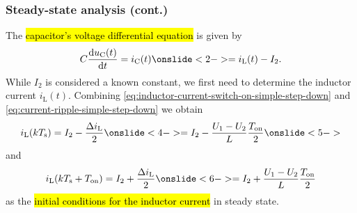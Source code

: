 \begin{frame}
    \frametitle{Steady-state analysis (cont.)}
     The \hl{capacitor's voltage differential equation} is given by
    \begin{equation}
        C \frac{\mathrm{d}u_\mathrm{C}(t)}{\mathrm{d}t} = i_\mathrm{C}(t) \onslide<2-> = i_\mathrm{L}(t) - I_2.
        \label{eq:capacitor-voltage-differential-equation-step-down-converter}
    \end{equation}
    While $I_2$ is considered a known constant, we first need to determine the inductor current $i_\mathrm{L}(t)$. Combining \eqref{eq:inductor-current-switch-on-simple-step-down} and \eqref{eq:current-ripple-simple-step-down} we obtain
    \begin{equation}
         i_\mathrm{L}(k T_\mathrm{s})  = I_2 - \frac{\Delta i_\mathrm{L}}{2} \onslide<4-> = I_2 - \frac{U_1 - U_2}{L} \frac{T_\mathrm{on}}{2} \onslide<5->
    \end{equation}
    and
    \begin{equation}
        i_\mathrm{L}(k T_\mathrm{s} + T_\mathrm{on})  = I_2 + \frac{\Delta i_\mathrm{L}}{2} \onslide<6-> = I_2 + \frac{U_1 - U_2}{L} \frac{T_\mathrm{on}}{2}
   \end{equation}
    as the \hl{initial conditions for the inductor current} in steady state. 
\end{frame}

